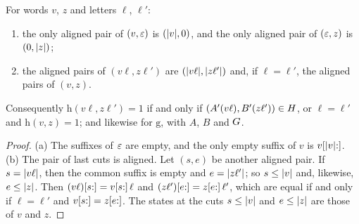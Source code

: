 \begin{lemma}\label{lem:nm-hit}
For words $v$, $z$ and letters $\ell$, $\ell'$:
\begin{enumerate}[label=(\alph*)]
\item the only aligned pair of $(v,\varepsilon)$ is $(\lvert v\rvert,0)$, and the only aligned
pair of $(\varepsilon,z)$ is $(0,\lvert z\rvert)$;
\item the aligned pairs of $(v\ell,z\ell')$ are $(\lvert v\ell\rvert,\lvert z\ell'\rvert)$
and, if $\ell=\ell'$, the aligned pairs of $(v,z)$.
\end{enumerate}
Consequently $\mathrm h(v\ell,z\ell')=1$ if and only if
$(A'(v\ell),B'(z\ell'))\in H$, or $\ell=\ell'$ and $\mathrm h(v,z)=1$; and
likewise for $\mathrm g$, with $A$, $B$ and $G$.
\end{lemma}

\begin{proof}
(a) The suffixes of $\varepsilon$ are empty, and the only empty suffix of $v$ is
$v[\lvert v\rvert{:}]$. (b) The pair of last cuts is aligned. Let $(s,e)$ be another
aligned pair. If $s=\lvert v\ell\rvert$, then the common suffix is empty and
$e=\lvert z\ell'\rvert$; so $s\le\lvert v\rvert$ and, likewise, $e\le\lvert z\rvert$. Then
$(v\ell)[s{:}]=v[s{:}]\,\ell$ and $(z\ell')[e{:}]=z[e{:}]\,\ell'$, which are
equal if and only if $\ell=\ell'$ and $v[s{:}]=z[e{:}]$. The states at the
cuts $s\le\lvert v\rvert$ and $e\le\lvert z\rvert$ are those of $v$ and $z$.
\end{proof}

